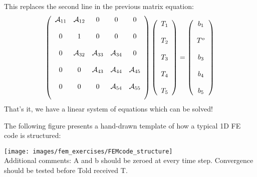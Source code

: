 This replaces the second line in the previous matrix equation:
\[
\left(
\begin{array}{ccccc}
{\cal A}_{11} & {\cal A}_{12} & 0& 0& 0\\ \\
0 & 1 & 0 & 0 & 0 \\ \\
0 & {\cal A}_{32} & {\cal A}_{33}&  {\cal A}_{34} & 0 \\\\
0&0&   {\cal A}_{43} & {\cal A}_{44}&  {\cal A}_{45} \\\\
0&0&0   & {\cal A}_{54}&  {\cal A}_{55} \\\\
\end{array}
\right)
\left(
\begin{array}{c}
T_1 \\\\ T_2 \\\\ T_3 \\\\ T_4 \\\\ T_5
\end{array}
\right)
=
\left(
\begin{array}{c}
b_{1} \\ \\
T^{o} \\ \\
b_{3}\\\\
b_{4}\\\\
b_{5}
\end{array}
\right)
\]
That's it, we have a linear system of equations which can be solved!


The following figure presents a hand-drawn template of how 
a typical 1D FE code is structured:
\begin{center}
\texttt{[image: images/fem\_exercises/FEMcode\_structure]}\\
{\captionfont Additional comments: A and b should be zeroed at every time step.
Convergence should be tested before Told received T.}
\end{center}



